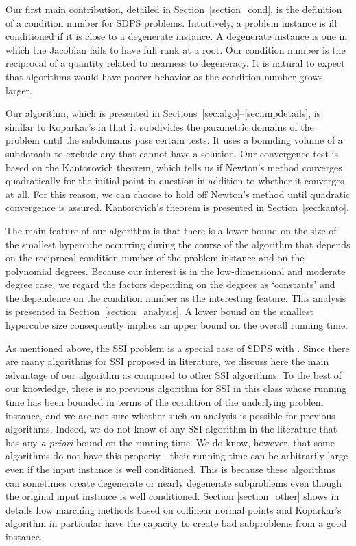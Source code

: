 \documentclass{article}
\begin{document}
Our first main contribution, detailed in Section~\ref{section_cond}, is the
definition of a condition number for SDPS problems.
Intuitively, a problem instance is ill conditioned if it 
is close to a degenerate instance.
A degenerate instance is one in which the Jacobian fails to have full rank at 
a root.  Our condition number is the reciprocal of a quantity
related to nearness to
degeneracy.  It is natural to expect that algorithms would have poorer behavior
as the condition number grows larger.

Our algorithm, which is presented in Sections~\ref{sec:algo}--\ref{sec:impdetails},
is similar to Koparkar's in that it subdivides the
parametric domains of the problem until the subdomains pass
certain tests. It uses a bounding volume of a subdomain to exclude
any that cannot have a solution.  Our convergence test is
based on the Kantorovich theorem, which tells us if Newton's
method converges quadratically for the initial point in question
in addition to whether it converges at all.  
For this reason, we
can choose to hold off Newton's method until quadratic convergence
is assured. Kantorovich's theorem is presented in Section~\ref{sec:kanto}.


The main feature of our algorithm is that there is a lower bound on
the size of the smallest hypercube occurring during the course of the
algorithm that depends on the reciprocal condition number of the
problem instance and on the polynomial degrees.  Because our interest is
in the low-dimensional and moderate degree case, we regard the factors
depending on the degrees as `constants' and the dependence on the
condition number as the interesting feature.
This analysis is presented in
Section~\ref{section_analysis}.  A lower bound on the smallest hypercube
size consequently implies an upper bound on the overall running time.  

As mentioned above, the SSI problem is a special case of SDPS with .  Since there are many algorithms for SSI proposed in literature, we discuss here the main advantage of our algorithm as compared to other SSI algorithms.  To the best of our knowledge, there is no previous algorithm for SSI in this class whose running time has been bounded in terms of the condition of
the underlying problem instance, and we are not sure whether such an
analysis is possible for previous algorithms.  Indeed, we do not know
of any SSI algorithm in the literature that has any {\em a priori}
bound on the running time.  We do know, however, that some algorithms
do not have this property---their running time can be arbitrarily
large even if the input instance is well conditioned.  This is because
these algorithms can sometimes create degenerate or nearly degenerate
subproblems even though the original input instance is well
conditioned.  Section \ref{section_other} shows in details how
marching methods based on collinear normal points and Koparkar's
algorithm in particular have the capacity to create bad subproblems
from a good instance.  
\end{document}
